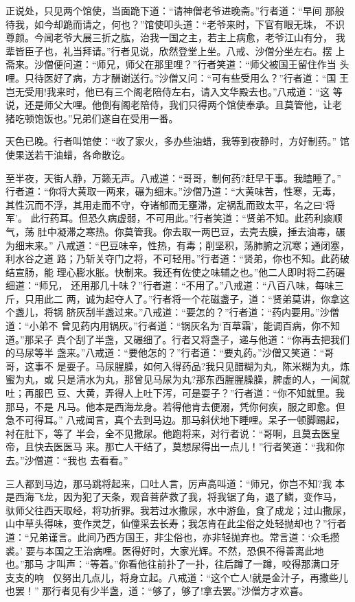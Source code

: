 正说处，只见两个馆使，当面跪下道：“请神僧老爷进晚斋。”行者道：“早间
那般待我，如今却跪而请之，何也？”馆使叩头道：“老爷来时，下官有眼无珠，
不识尊颜。今闻老爷大展三折之肱，治我一国之主，若主上病愈，老爷江山有分，
我辈皆臣子也，礼当拜请。”行者见说，欣然登堂上坐。八戒、沙僧分坐左右。摆
上斋来。沙僧便问道：“师兄，师父在那里哩？”行者笑道：“师父被国王留住作当
头哩。只待医好了病，方才酬谢送行。”沙僧又问：“可有些受用么？”行者道：“国
王岂无受用!我来时，他已有三个阁老陪侍左右，请入文华殿去也。”八戒道：“这
等说，还是师父大哩。他倒有阁老陪侍，我们只得两个馆使奉承。且莫管他，让老
猪吃顿饱饭也。”兄弟们遂自在受用一番。

天色已晚。行者叫馆使：“收了家火，多办些油蜡，我等到夜静时，方好制药。”
馆使果送若干油蜡，各命散讫。

至半夜，天街人静，万籁无声。八戒道：“哥哥，制何药?赶早干事。我瞌睡了。”
行者道：“你将大黄取一两来，碾为细末。”沙僧乃道：“大黄味苦，性寒，无毒，
其性沉而不浮，其用走而不守，夺诸郁而无壅滞，定祸乱而致太平，名之曰‘将军’。
此行药耳。但恐久病虚弱，不可用此。”行者笑道：“贤弟不知。此药利痰顺气，荡
肚中凝滞之寒热。你莫管我。你去取一两巴豆，去壳去膜，捶去油毒，碾为细末来。”
八戒道：“巴豆味辛，性热，有毒；削坚积，荡肺腑之沉寒；通闭塞，利水谷之道
路；乃斩关夺门之将，不可轻用。”行者道：“贤弟，你也不知。此药破结宣肠，能
理心膨水胀。快制来。我还有佐使之味辅之也。”他二人即时将二药碾细道：“师兄，
还用那几十味？”行者道：“不用了。”八戒道：“八百八味，每味三斤，只用此二
两，诚为起夺人了。”行者将一个花磁盏子，道：“贤弟莫讲，你拿这个盏儿，将锅
脐灰刮半盏过来。”八戒道：“要怎的？”行者道：“药内要用。”沙僧道：“小弟不
曾见药内用锅灰。”行者道：“锅灰名为‘百草霜’，能调百病，你不知道。”那呆子
真个刮了半盏，又碾细了。行者又将盏子，递与他道：“你再去把我们的马尿等半
盏来。”八戒道：“要他怎的？”行者道：“要丸药。”沙僧又笑道：“哥哥，这事不
是耍子。马尿腥臊，如何入得药品?我只见醋糊为丸，陈米糊为丸，炼蜜为丸，或
只是清水为丸，那曾见马尿为丸?那东西腥腥臊臊，脾虚的人，一闻就吐；再服巴
豆、大黄，弄得人上吐下泻，可是耍子？”行者道：“你不知就里。我那马，不是
凡马。他本是西海龙身。若得他肯去便溺，凭你何疾，服之即愈。但急不可得耳。”
八戒闻言，真个去到马边。那马斜伏地下睡哩。呆子一顿脚踢起，衬在肚下，等了
半会，全不见撒尿。他跑将来，对行者说：“哥啊，且莫去医皇帝，且快去医医马
来。那亡人干结了，莫想尿得出一点儿！”行者笑道：“我和你去。”沙僧道：“我也
去看看。”

三人都到马边，那马跳将起来，口吐人言，厉声高叫道：“师兄，你岂不知?我
本是西海飞龙，因为犯了天条，观音菩萨救了我，将我锯了角，退了鳞，变作马，
驮师父往西天取经，将功折罪。我若过水撒尿，水中游鱼，食了成龙；过山撒尿，
山中草头得味，变作灵芝，仙僮采去长寿；我怎肯在此尘俗之处轻抛却也？”行者
道：“兄弟谨言。此间乃西方国王，非尘俗也，亦非轻抛弃也。常言道：‘众毛攒裘。’
要与本国之王治病哩。医得好时，大家光辉。不然，恐俱不得善离此地也。”那马
才叫声：“等着。”你看他往前扑了一扑，往后蹲了一蹲，咬得那满口牙支支的响
，仅努出几点儿，将身立起。八戒道：“这个亡人!就是金汁子，再撒些儿也罢！”
那行者见有少半盏，道：“够了，够了!拿去罢。”沙僧方才欢喜。

